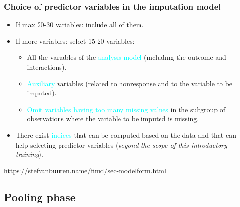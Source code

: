 \documentclass{beamer}
\begin{document}
\begin{frame}
\frametitle{Choice of predictor variables in the imputation model}
\begin{itemize}
\setlength\itemsep{0.3cm}
	\item If max 20-30 variables: include all of them.
	\item If more variables: select 15-20 variables:
		\begin{itemize}
			\item All the variables of the \textcolor{cyan}{analysis model} (including the outcome and interactions).
			\item \textcolor{cyan}{Auxiliary} variables (related to nonresponse and to the variable to be imputed).
			\item \textcolor{cyan}{Omit variables having too many missing values} in the subgroup of observations where the variable to be imputed is missing.
		\end{itemize}
	\item There exist \textcolor{cyan}{indices} that can be computed based on the data and that can help selecting predictor variables (\emph{beyond the scope of this introductory training}).
\end{itemize}
\vfill
\footnotesize{\url{https://stefvanbuuren.name/fimd/sec-modelform.html}}

\end{frame}


\subsection{Pooling phase}
\end{document}
